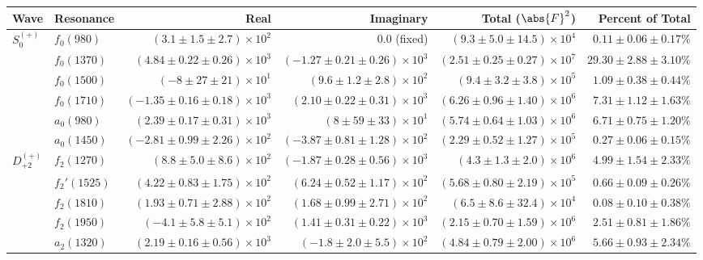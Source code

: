 \begin{table}[ht]
    \begin{center}
        \begin{tabular}{llrrrr}\toprule
        Wave & Resonance & Real & Imaginary & Total ($\abs{F}^2$) & Percent of Total \\\midrule
$S_{0}^{(+)}$ & $f_{0}(980)$ & $(3.1 \pm 1.5 \pm 2.7) \times 10^{2}$ & $0.0$ (fixed) & $(9.3 \pm 5.0 \pm 14.5) \times 10^{4}$ & $0.11 \pm 0.06 \pm 0.17 \%$ \\
 & $f_{0}(1370)$ & $(4.84 \pm 0.22 \pm 0.26) \times 10^{3}$ & $(-1.27 \pm 0.21 \pm 0.26) \times 10^{3}$ & $(2.51 \pm 0.25 \pm 0.27) \times 10^{7}$ & $29.30 \pm 2.88 \pm 3.10 \%$ \\
 & $f_{0}(1500)$ & $(-8 \pm 27 \pm 21) \times 10^{1}$ & $(9.6 \pm 1.2 \pm 2.8) \times 10^{2}$ & $(9.4 \pm 3.2 \pm 3.8) \times 10^{5}$ & $1.09 \pm 0.38 \pm 0.44 \%$ \\
 & $f_{0}(1710)$ & $(-1.35 \pm 0.16 \pm 0.18) \times 10^{3}$ & $(2.10 \pm 0.22 \pm 0.31) \times 10^{3}$ & $(6.26 \pm 0.96 \pm 1.40) \times 10^{6}$ & $7.31 \pm 1.12 \pm 1.63 \%$ \\
 & $a_{0}(980)$ & $(2.39 \pm 0.17 \pm 0.31) \times 10^{3}$ & $(8 \pm 59 \pm 33) \times 10^{1}$ & $(5.74 \pm 0.64 \pm 1.03) \times 10^{6}$ & $6.71 \pm 0.75 \pm 1.20 \%$ \\
 & $a_{0}(1450)$ & $(-2.81 \pm 0.99 \pm 2.26) \times 10^{2}$ & $(-3.87 \pm 0.81 \pm 1.28) \times 10^{2}$ & $(2.29 \pm 0.52 \pm 1.27) \times 10^{5}$ & $0.27 \pm 0.06 \pm 0.15 \%$ \\
$D_{+2}^{(+)}$ & $f_{2}(1270)$ & $(8.8 \pm 5.0 \pm 8.6) \times 10^{2}$ & $(-1.87 \pm 0.28 \pm 0.56) \times 10^{3}$ & $(4.3 \pm 1.3 \pm 2.0) \times 10^{6}$ & $4.99 \pm 1.54 \pm 2.33 \%$ \\
 & $f_{2}'(1525)$ & $(4.22 \pm 0.83 \pm 1.75) \times 10^{2}$ & $(6.24 \pm 0.52 \pm 1.17) \times 10^{2}$ & $(5.68 \pm 0.80 \pm 2.19) \times 10^{5}$ & $0.66 \pm 0.09 \pm 0.26 \%$ \\
 & $f_{2}(1810)$ & $(1.93 \pm 0.71 \pm 2.88) \times 10^{2}$ & $(1.68 \pm 0.99 \pm 2.71) \times 10^{2}$ & $(6.5 \pm 8.6 \pm 32.4) \times 10^{4}$ & $0.08 \pm 0.10 \pm 0.38 \%$ \\
 & $f_{2}(1950)$ & $(-4.1 \pm 5.8 \pm 5.1) \times 10^{2}$ & $(1.41 \pm 0.31 \pm 0.22) \times 10^{3}$ & $(2.15 \pm 0.70 \pm 1.59) \times 10^{6}$ & $2.51 \pm 0.81 \pm 1.86 \%$ \\
 & $a_{2}(1320)$ & $(2.19 \pm 0.16 \pm 0.56) \times 10^{3}$ & $(-1.8 \pm 2.0 \pm 5.5) \times 10^{2}$ & $(4.84 \pm 0.79 \pm 2.00) \times 10^{6}$ & $5.66 \pm 0.93 \pm 2.34 \%$ \\

\end{tabular}
\end{center}
\end{table}
